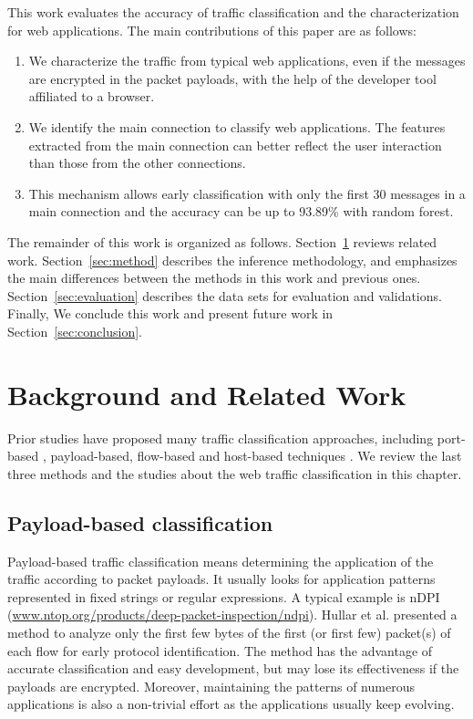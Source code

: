 \documentclass[preprint,12pt]{elsarticle}
\begin{document}
This work evaluates the accuracy of traffic classification and the characterization for web applications. The main contributions of this paper are as follows:

\begin{enumerate}
\item 
We characterize the traffic from typical web applications, even if the messages are encrypted in the packet payloads, with the help of the developer tool affiliated to a browser.
\item
We identify the main connection to classify web applications. The features extracted from the main connection can better reflect the user interaction than those from the other connections.  
\item
This mechanism allows early classification with only the first 30 messages in a main connection and the accuracy can be up to 93.89\% with random forest. 

\end{enumerate}

The remainder of this work is organized as follows. Section~\ref{sec:background} reviews related work. Section~\ref{sec:method} describes the inference methodology, and emphasizes the main differences between the methods in this work and previous ones. Section~\ref{sec:evaluation} describes the data sets for evaluation and validations. Finally, We conclude this work and present future work in Section~\ref{sec:conclusion}.

\section{Background and Related Work}
\label{sec:background}
Prior studies have proposed many traffic classification approaches, including port-based \cite{TTC}, payload-based, flow-based and host-based techniques \cite{TCI13}. We review the last three methods and the studies about the web traffic classification in this chapter.    


\subsection{Payload-based classification}
\label{sec:payload}
Payload-based traffic classification means determining the application of the traffic according to packet payloads. It usually looks for application patterns represented in fixed strings or regular expressions. A typical example is nDPI (\url{www.ntop.org/products/deep-packet-inspection/ndpi}). Hullar et al. \cite{EMF14} presented a method to analyze only the first few bytes of the first (or first few) packet(s) of each flow for early protocol identification. The method has the advantage of accurate classification and easy development, but may lose its effectiveness if the payloads are encrypted. Moreover, maintaining the patterns of numerous applications is also a non-trivial effort as the applications usually keep evolving.
\end{document}
